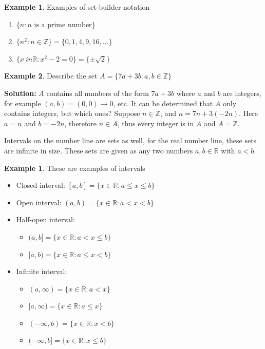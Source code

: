 \documentclass[10pt]{article}
\newcommand{\R}{\mathbb{R}}
\newcommand{\Z}{\mathbb{Z}}
\theoremstyle{definition}
\newtheorem{example}{Example}
\newtheorem*{examplenull}{Example}
\begin{document}
\begin{example}
    Examples of set-builder notation
    \begin{enumerate}
        \item $\{ n : n \text{ is a prime number} \}$
        \item $\{ n^2 : n \in \Z\} = \{ 0, 1, 4, 9, 16, \dots \}$
        \item $\{x \ in \R: x^2-2=0\}=\{ \pm \sqrt{2} \}$
    \end{enumerate}
\end{example}

\begin{example}
    Describe the set $A = \{ 7a + 3b: a,b \in \Z \}$

    \noindent \textbf{Solution:} $A$ contains all numbers of the form $7a + 3b$ where $a$ and $b$ are integers, for example $(a,b) = (0,0) \rightarrow 0$, etc. It can be determined that $A$ only contains integers, but which ones? Suppose $n \in \Z$, and $n = 7n + 3(-2n)$. Here $a = n$ and $b = -2n$, therefore $n \in A$, thus every integer is in $A$ and $A = \Z$.
\end{example}

Intervals on the number line are sets as well, for the real number line, these sets are infinite in size. These sets are given as any two numbers $a,b\in \R$ with $a<b$.

\begin{examplenull}
    These are examples of intervals
    \begin{itemize}
        \item Closed interval: $[a,b] = \{x \in \R : a \leq x \leq b\}$
        \item Open interval: $(a,b) = \{x \in \R : a < x < b\}$
        \item Half-open interval:
            \begin{itemize}
                \item $(a,b] = \{x \in \R : a < x \leq b\}$
                \item $[a,b) = \{x \in \R : a \leq x < b\}$
            \end{itemize}
        \item Infinite interval:
            \begin{itemize}
                \item $(a,\infty) = \{x \in \R: a < x\}$
                \item $[a,\infty) = \{x \in \R: a \leq x\}$
                \item $(-\infty,b) = \{x \in \R: x < b\}$
                \item $(-\infty,b] = \{x \in \R: x \leq b\}$
            \end{itemize}
    \end{itemize}
\end{examplenull}
\end{document}
